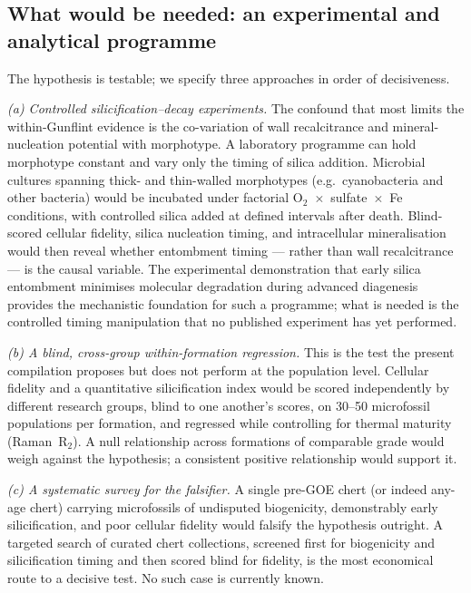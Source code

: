 \documentclass[11pt]{article}
\begin{document}
\subsection{What would be needed: an experimental and analytical programme}

The hypothesis is testable; we specify three approaches in order of decisiveness.

\textit{(a) Controlled silicification--decay experiments.} The confound that most limits the
within-Gunflint evidence is the co-variation of wall recalcitrance and mineral-nucleation potential
with morphotype. A laboratory programme can hold morphotype constant and vary only the timing of
silica addition. Microbial cultures spanning thick- and thin-walled morphotypes (e.g.\ cyanobacteria
and other bacteria) would be incubated under factorial O$_2$~$\times$~sulfate~$\times$~Fe conditions,
with controlled silica added at defined intervals after death. Blind-scored cellular fidelity, silica
nucleation timing, and intracellular mineralisation would then reveal whether entombment timing ---
rather than wall recalcitrance --- is the causal variable. The experimental demonstration that early
silica entombment minimises molecular degradation during advanced diagenesis \citep{Alleon2016b}
provides the mechanistic foundation for such a programme; what is needed is the controlled timing
manipulation that no published experiment has yet performed.

\textit{(b) A blind, cross-group within-formation regression.} This is the test the present
compilation proposes but does not perform at the population level. Cellular fidelity and a
quantitative silicification index would be scored independently by different research groups, blind
to one another's scores, on 30--50 microfossil populations per formation, and regressed while
controlling for thermal maturity (Raman~R$_2$). A null relationship across formations of comparable
grade would weigh against the hypothesis; a consistent positive relationship would support it.

\textit{(c) A systematic survey for the falsifier.} A single pre-GOE chert (or indeed any-age chert)
carrying microfossils of undisputed biogenicity, demonstrably early silicification, and poor cellular
fidelity would falsify the hypothesis outright. A targeted search of curated chert collections,
screened first for biogenicity and silicification timing and then scored blind for fidelity, is the
most economical route to a decisive test. No such case is currently known.
\end{document}
